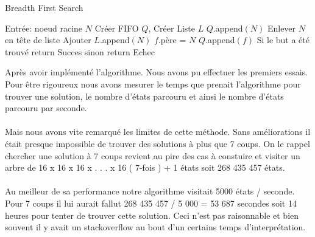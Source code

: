 \documentclass{article}
\begin{document}
\begin{algorithm}
\caption{Breadth First Search}
\label{alg:bfs-reach}
\begin{algorithmic}[1]
  \STATE Entrée: noeud racine $N$
  \STATE Créer FIFO $Q$, Créer Liste $L$
  \STATE $Q$.append$(N)$
    \STATE Enlever $N$ en tête de liste
    \STATE Ajouter $L$.append$(N)$
      \STATE $f$.père = $N$
      \STATE $Q$.append$(f)$
    \ENDFOR
  \ENDWHILE
  \STATE Si le but a été trouvé return Succes sinon return Echec

\end{algorithmic}
\end{algorithm}
Après avoir implémenté l'algorithme. Nous avons pu effectuer les premiers essais. Pour être rigoureux nous avons mesurer le temps que prenait l'algorithme pour trouver une solution, le nombre d'états parcouru et ainsi le nombre d'états parcouru par seconde.
\\\\
Mais nous avons vite remarqué les limites de cette méthode. Sans améliorations il était presque impossible de trouver des solutions à plus que 7 coups. On le rappel chercher une solution à 7 coups revient au pire des cas à constuire et visiter un arbre de 16 x 16 x 16 x . . . x 16 ( 7-fois ) + 1 états soit 268 435 457 états.\\\\
Au meilleur de sa performance notre algorithme visitait 5000 états / seconde. Pour 7 coups il lui aurait fallut 268 435 457 / 5 000 = 53 687 secondes soit 14 heures pour tenter de trouver cette solution. Ceci n'est pas raisonnable et bien souvent il y avait un stackoverflow au bout d'un certains temps d'interprétation.
\end{document}
